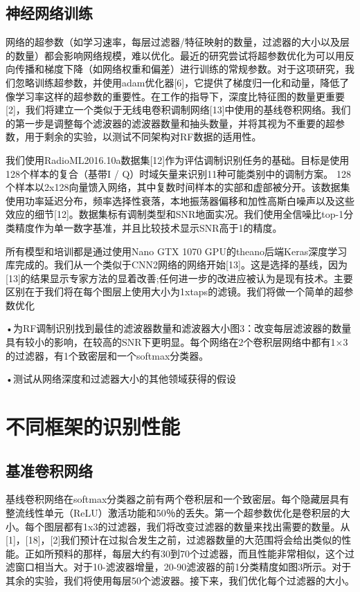 \subsection{神经网络训练}

网络的超参数（如学习速率，每层过滤器/特征映射的数量，过滤器的大小以及层的数量）都会影响网络规模，难以优化。最近的研究尝试将超参数优化为可以用反向传播和梯度下降（如网络权重和偏差）进行训练的常规参数。对于这项研究，我们忽略训练超参数，并使用adam优化器[6]，它提供了梯度归一化和动量，降低了像学习率这样的超参数的重要性。在工作的指导下，深度比特征图的数量更重要[2]，我们将建立一个类似于无线电卷积调制网络[13]中使用的基线卷积网络。我们的第一步是调整每个滤波器的滤波器数量和抽头数量，并将其视为不重要的超参数，用于剩余的实验，以测试不同架构对RF数据的适用性。\par

我们使用RadioML2016.10a数据集[12]作为评估调制识别任务的基础。目标是使用128个样本的复合（基带I / Q）时域矢量来识别11种可能类别中的调制方案。 128个样本以2x128向量馈入网络，其中复数时间样本的实部和虚部被分开。该数据集使用功率延迟分布，频率选择性衰落，本地振荡器偏移和加性高斯白噪声以及这些效应的细节[12]。数据集标有调制类型和SNR地面实况。我们使用全信噪比top-1分类精度作为单一数字基准，并且比较技术显示SNR高于1的精度。\par

所有模型和培训都是通过使用Nano GTX 1070 GPU的theano后端Keras深度学习库完成的。我们从一个类似于CNN2网络的网络开始[13]。这是选择的基线，因为[13]的结果显示专家方法的显着改善;任何进一步的改进应被认为是现有技术。主要区别在于我们将在每个图层上使用大小为1xtaps的滤镜。我们将做一个简单的超参数优化\par

•为RF调制识别找到最佳的滤波器数量和滤波器大小图3：改变每层滤波器的数量具有较小的影响，在较高的SNR下更明显。每个网络在2个卷积层网络中都有1×3的过滤器，有1个致密层和一个softmax分类器。\par

•测试从网络深度和过滤器大小的其他领域获得的假设\par

\section{不同框架的识别性能}

\subsection{基准卷积网络}

基线卷积网络在softmax分类器之前有两个卷积层和一个致密层。每个隐藏层具有整流线性单元（ReLU）激活功能和50％的丢失。第一个超参数优化是卷积层的大小。每个图层都有1x3的过滤器，我们将改变过滤器的数量来找出需要的数量。从[1]，[18]，[2]我们预计在过拟合发生之前，过滤器数量的大范围将会给出类似的性能。正如所预料的那样，每层大约有30到70个过滤器，而且性能非常相似，这个过滤窗口相当大。对于10-滤波器增量，20-90滤波器的前1分类精度如图3所示。对于其余的实验，我们将使用每层50个滤波器。接下来，我们优化每个过滤器的大小。\par

